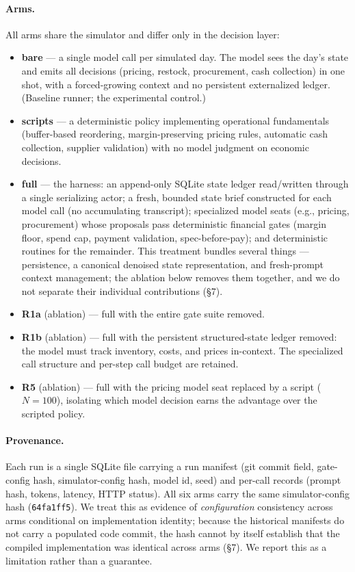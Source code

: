 \documentclass[11pt]{article}
\begin{document}
\paragraph{Arms.} All arms share the simulator and differ only in the decision
layer:
\begin{itemize}
\item \textbf{bare} --- a single model call per simulated day. The model sees
the day's state and emits all decisions (pricing, restock, procurement, cash
collection) in one shot, with a forced-growing context and no persistent
externalized ledger. (Baseline runner; the experimental control.)
\item \textbf{scripts} --- a deterministic policy implementing operational
fundamentals (buffer-based reordering, margin-preserving pricing rules,
automatic cash collection, supplier validation) with no model judgment on
economic decisions.
\item \textbf{full} --- the harness: an append-only SQLite state ledger
read/written through a single serializing actor; a fresh, bounded state brief
constructed for each model call (no accumulating transcript); specialized model
seats (e.g., pricing, procurement) whose proposals pass deterministic financial
gates (margin floor, spend cap, payment validation, spec-before-pay); and
deterministic routines for the remainder. This treatment bundles several things
--- persistence, a canonical denoised state representation, and fresh-prompt
context management; the ablation below removes them together, and we do not
separate their individual contributions (\S7).
\item \textbf{R1a} (ablation) --- full with the entire gate suite removed.
\item \textbf{R1b} (ablation) --- full with the persistent structured-state
ledger removed: the model must track inventory, costs, and prices in-context.
The specialized call structure and per-step call budget are retained.
\item \textbf{R5} (ablation) --- full with the pricing model seat replaced by a
script ($N=100$), isolating which model decision earns the advantage over the
scripted policy.
\end{itemize}

\paragraph{Provenance.} Each run is a single SQLite file carrying a run
manifest (git commit field, gate-config hash, simulator-config hash, model id,
seed) and per-call records (prompt hash, tokens, latency, HTTP status). All six
arms carry the same simulator-config hash (\texttt{64fa1ff5}). We treat this as
evidence of \emph{configuration} consistency across arms conditional on
implementation identity; because the historical manifests do not carry a
populated code commit, the hash cannot by itself establish that the compiled
implementation was identical across arms (\S7). We report this as a limitation
rather than a guarantee.
\end{document}
